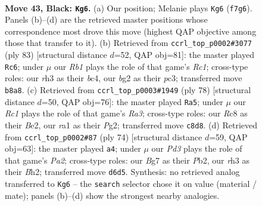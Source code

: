 \documentclass[11pt]{article}
\begin{document}
\clearpage

\begin{figure}[p]\centering
\begin{subfigure}{0.46\textwidth}\centering
\resizebox{\linewidth}{!}{%
\newchessgame
\chessboard[
  setfen={1rr5/1n3kbp/p2p4/P3p1Pp/1pP1P3/1P3P1R/2K3B1/R3B3 b - - 1 43},
  showmover=false,
  pgfstyle=straightmove, color=movearrow, markmove={f7-g6}
]}
\caption{}
\end{subfigure}\hfill
\begin{subfigure}{0.46\textwidth}\centering
\resizebox{\linewidth}{!}{%
\newchessgame
\chessboard[
  setfen={2rr4/1p4k1/p2P1n2/2p1p1p1/2B1P1Pp/1PPR3P/5K2/3R4 b - - 1 42},
  showmover=false,
  pgfstyle=straightmove, color=movearrow, markmove={c8-c6}
]}
\caption{}
\end{subfigure}
\\[4pt]
\begin{subfigure}{0.46\textwidth}\centering
\resizebox{\linewidth}{!}{%
\newchessgame
\chessboard[
  setfen={2r5/r2n1pk1/p3b3/2Pp2p1/4p2p/RN2P2P/4BPP1/R3K3 w - - 1 40},
  showmover=false,
  pgfstyle=straightmove, color=movearrow, markmove={a3-a5}
]}
\caption{}
\end{subfigure}\hfill
\begin{subfigure}{0.46\textwidth}\centering
\resizebox{\linewidth}{!}{%
\newchessgame
\chessboard[
  setfen={3br1n1/1kp2r2/p7/1pp1Pp2/7p/2N4P/PPP3PB/4RR1K w - - 8 38},
  showmover=false,
  pgfstyle=straightmove, color=movearrow, markmove={a2-a4}
]}
\caption{}
\end{subfigure}
\caption{\textbf{Move 43, Black: \texttt{Kg6}.} (a) Our position; Melanie plays \texttt{Kg6} (\texttt{f7g6}). Panels (b)--(d) are the retrieved master positions whose correspondence most drove this move (highest QAP objective among those that transfer to it). (b) Retrieved from \texttt{ccrl\_top\_p0002\#3077} (ply 83) [structural distance $d$=52, QAP obj=81]: the master played \texttt{Rc6}; under $\mu$ our \emph{Rb1} plays the role of that game's \emph{Rc1}; cross-type roles: our \emph{r}h3 as their \emph{b}c4, our \emph{b}g2 as their \emph{p}c3; transferred move \texttt{b8a8}. (c) Retrieved from \texttt{ccrl\_top\_p0003\#1949} (ply 78) [structural distance $d$=50, QAP obj=76]: the master played \texttt{Ra5}; under $\mu$ our \emph{Rc1} plays the role of that game's \emph{Ra3}; cross-type roles: our \emph{R}c8 as their \emph{B}e2, our \emph{r}a1 as their \emph{P}g2; transferred move \texttt{c8d8}. (d) Retrieved from \texttt{ccrl\_top\_p0002\#87} (ply 74) [structural distance $d$=59, QAP obj=63]: the master played \texttt{a4}; under $\mu$ our \emph{Pd3} plays the role of that game's \emph{Pa2}; cross-type roles: our \emph{B}g7 as their \emph{P}b2, our \emph{r}h3 as their \emph{B}h2; transferred move \texttt{d6d5}. Synthesis: no retrieved analog transferred to \texttt{Kg6} -- the \texttt{search} selector chose it on value (material / mate); panels (b)--(d) show the strongest nearby analogies.}
\label{fig:thought-m85}
\end{figure}
\end{document}
